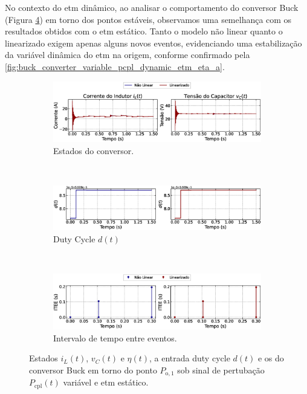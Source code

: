 No contexto do \acrshort{etm} dinâmico, ao analisar o comportamento do conversor Buck (Figura \ref{fig:buck_converter_variable_pcpl_dynamic_etm_op1}) em torno dos pontos estáveis, observamos uma semelhança com os resultados obtidos com o \acrshort{etm} estático. Tanto o modelo não linear quanto o linearizado exigem apenas alguns novos eventos, evidenciando uma estabilização da variável dinâmica do \acrshort{etm} na origem, conforme confirmado pela \autoref{fig:buck_converter_variable_pcpl_dynamic_etm_eta_a}.

\begin{figure}[H]
  \centering
  \captionsetup{justification=centering}
  \begin{subfigure}{1.\textwidth}
    \centering
    \includegraphics[width=1.\textwidth]{figuras/dynamic-etm/buck/sim2/op1/result.eps}
    \caption{Estados do conversor.}
    \label{fig:buck_converter_variable_pcpl_dynamic_etm_op1_a}
  \end{subfigure}
  \\[6pt]
  \begin{subfigure}{1.\textwidth}
    \centering
    \includegraphics[width=1.\textwidth]{figuras/dynamic-etm/buck/sim2/op1/duty-cycle.eps}
    \caption{Duty Cycle $d(t)$}
    \label{fig:buck_converter_variable_pcpl_dynamic_etm_op1_b}
  \end{subfigure}
  \\[6pt]
  \begin{subfigure}{1.\textwidth}
    \centering
    \includegraphics[width=1.\textwidth]{figuras/dynamic-etm/buck/sim2/op1/inter-event-times.eps}
    \caption{Intervalo de tempo entre eventos.}
    \label{fig:buck_converter_variable_pcpl_dynamic_etm_op1_c}
  \end{subfigure}
  \caption{Estados $i_L(t)$, $v_C(t)$ e $\eta(t)$, a entrada duty cycle $d(t)$ e os  do conversor Buck em torno do ponto $P_{\mathrm{o}, 1}$ sob sinal de pertubação $P_{\mathrm{cpl}}(t)$ variável e \acrshort{etm} estático.}
  \label{fig:buck_converter_variable_pcpl_dynamic_etm_op1}
\end{figure}

